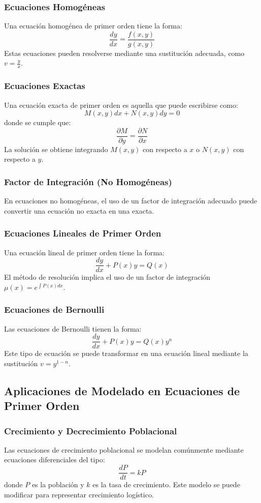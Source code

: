 \documentclass{article}
\begin{document}
\subsubsection{Ecuaciones Homogéneas}
Una ecuación homogénea de primer orden tiene la forma:
\[
\frac{dy}{dx} = \frac{f(x, y)}{g(x, y)}
\]
Estas ecuaciones pueden resolverse mediante una sustitución adecuada, como \( v = \frac{y}{x} \).

\subsubsection{Ecuaciones Exactas}
Una ecuación exacta de primer orden es aquella que puede escribirse como:
\[
M(x, y)dx + N(x, y)dy = 0
\]
donde se cumple que:
\[
\frac{\partial M}{\partial y} = \frac{\partial N}{\partial x}
\]
La solución se obtiene integrando \( M(x, y) \) con respecto a \( x \) o \( N(x, y) \) con respecto a \( y \).

\subsubsection{Factor de Integración (No Homogéneas)}
En ecuaciones no homogéneas, el uso de un factor de integración adecuado puede convertir una ecuación no exacta en una exacta.

\subsubsection{Ecuaciones Lineales de Primer Orden}
Una ecuación lineal de primer orden tiene la forma:
\[
\frac{dy}{dx} + P(x)y = Q(x)
\]
El método de resolución implica el uso de un factor de integración \( \mu(x) = e^{\int P(x)dx} \).

\subsubsection{Ecuaciones de Bernoulli}
Las ecuaciones de Bernoulli tienen la forma:
\[
\frac{dy}{dx} + P(x)y = Q(x)y^n
\]
Este tipo de ecuación se puede transformar en una ecuación lineal mediante la sustitución \( v = y^{1-n} \).

\subsection{Aplicaciones de Modelado en Ecuaciones de Primer Orden}

\subsubsection{Crecimiento y Decrecimiento Poblacional}
Las ecuaciones de crecimiento poblacional se modelan comúnmente mediante ecuaciones diferenciales del tipo:
\[
\frac{dP}{dt} = kP
\]
donde \( P \) es la población y \( k \) es la tasa de crecimiento. Este modelo se puede modificar para representar crecimiento logístico.
\end{document}
